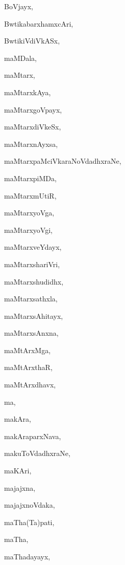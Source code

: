 \begin{multicols}{2}
{BoVjayx}, \pageref{BoVjayx}

{BwtikabarxhamxcAri}, \pageref{BwtikabarxhamxcAri}

{BwtikiVdiVkASx}, \pageref{BwtikiVdiVkASx}

{maMDala}, \pageref{maMDala}

{maMtarx}, \pageref{maMtarx}

{maMtarxkAya}, \pageref{maMtarxkAya}

{maMtarxgoVpayx}, \pageref{maMtarxgoVpayx}

{maMtarxdiVkeSx}, \pageref{maMtarxdiVkeSx}

{maMtarxnAyxsa}, \pageref{maMtarxnAyxsa}

{maMtarxpaMciVkaraNoVdadhxraNe}, \pageref{maMtarxpaMciVkaraNoVdadhxraNe}

{maMtarxpiMDa}, \pageref{maMtarxpiMDa}

{maMtarxmUtiR}, \pageref{maMtarxmUtiR}

{maMtarxyoVga}, \pageref{maMtarxyoVga}

{maMtarxyoVgi}, \pageref{maMtarxyoVgi}

{maMtarxveYdayx}, \pageref{maMtarxveYdayx}

{maMtarxshariVri}, \pageref{maMtarxshariVri}

{maMtarxshudidhx}, \pageref{maMtarxshudidhx}

{maMtarxsathxla}, \pageref{maMtarxsathxla}

{maMtarxsAhitayx}, \pageref{maMtarxsAhitayx}

{maMtarxsAnxna}, \pageref{maMtarxsAnxna}

{maMtArxMga}, \pageref{maMtArxMga}

{maMtArxthaR}, \pageref{maMtArxthaR}

{maMtArxdhavx}, \pageref{maMtArxdhavx}

{ma}, \pageref{ma}

{makAra}, \pageref{makAra}

{makAraparxNava}, \pageref{makAraparxNava}

{makuToVdadhxraNe}, \pageref{makuToVdadhxraNe}

{maKAri}, \pageref{maKAri}

{majajxna}, \pageref{majajxna}

{majajxnoVdaka}, \pageref{majajxnoVdaka}

{maTha(Ta)pati}, \pageref{maThaTapati}

{maTha}, \pageref{maTha}

{maThadayayx}, \pageref{maThadayayx}


\end{multicols}
